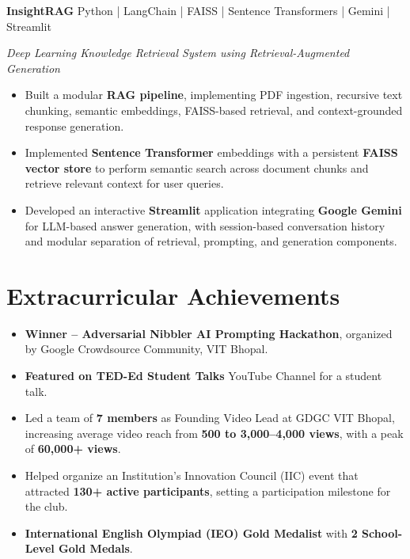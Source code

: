\documentclass[10pt,a4paper]{article}
\begin{document}
\vspace{2pt}

\textbf{InsightRAG} \hfill Python | LangChain | FAISS | Sentence Transformers | Gemini | Streamlit

\textit{Deep Learning Knowledge Retrieval System using Retrieval-Augmented Generation}

\begin{itemize}[leftmargin=15pt,itemsep=1pt,topsep=1pt,parsep=0pt,partopsep=0pt]

\item Built a modular \textbf{RAG pipeline}, implementing PDF ingestion, recursive text chunking, semantic embeddings, FAISS-based retrieval, and context-grounded response generation.

\item Implemented \textbf{Sentence Transformer} embeddings with a persistent \textbf{FAISS vector store} to perform semantic search across document chunks and retrieve relevant context for user queries.

\item Developed an interactive \textbf{Streamlit} application integrating \textbf{Google Gemini} for LLM-based answer generation, with session-based conversation history and modular separation of retrieval, prompting, and generation components.

\end{itemize}


\section*{Extracurricular Achievements}

\begin{itemize}[leftmargin=*, itemsep=0pt, topsep=0pt, parsep=0pt, partopsep=0pt]

    \item \textbf{Winner -- Adversarial Nibbler AI Prompting Hackathon}, organized by Google Crowdsource Community, VIT Bhopal.

    \item \textbf{Featured on TED-Ed Student Talks} YouTube Channel for a student talk.

    \item Led a team of \textbf{7 members} as Founding Video Lead at GDGC VIT Bhopal, increasing average video reach from \textbf{500 to 3,000--4,000 views}, with a peak of \textbf{60,000+ views}.

    \item Helped organize an Institution's Innovation Council (IIC) event that attracted \textbf{130+ active participants}, setting a participation milestone for the club.

    \item \textbf{International English Olympiad (IEO) Gold Medalist} with \textbf{2 School-Level Gold Medals}.

\end{itemize}
\end{document}
